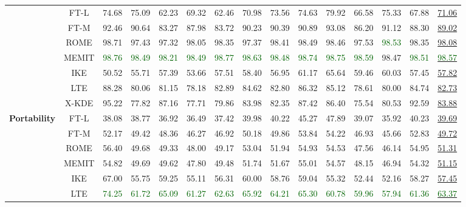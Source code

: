 \begin{table*}[!h]
{\begin{tabular}{ccccccccccccccc}
            & FT-L & 74.68 & 75.09 & 62.23 & 69.32 & 62.46 & 70.98 & 73.56 & 74.63 & 79.92 & 66.58 & 75.33 & 67.88 & \underline{71.06} \\
            & FT-M &  92.46 & 90.64 & 83.27 & 87.98 & 83.72 & 90.23 & 90.39 & 90.89 & 93.08 & 86.20 & 91.12 & 88.30 & \underline{89.02} \\
            & ROME & 98.71 & 97.43 & 97.32 & 98.05 & 98.35 & 97.37 & 98.41 & 98.49 & 98.46 & 97.53 & \textcolor{darkgreen}{98.53} & 98.35 & \underline{98.08} \\
            & MEMIT & \textcolor{darkgreen}{98.76} &\textcolor{darkgreen}{ 98.49} & \textcolor{darkgreen}{98.21 }&\textcolor{darkgreen}{ 98.49 }& \textcolor{darkgreen}{98.77 }& \textcolor{darkgreen}{98.63 }& \textcolor{darkgreen}{98.48} &\textcolor{darkgreen}{ 98.74 }&\textcolor{darkgreen}{ 98.75} & \textcolor{darkgreen}{98.59} & 98.47 & \textcolor{darkgreen}{98.51} &\underline{\textcolor{darkgreen}{ 98.57}} \\
            & IKE & 50.52 & 55.71 & 57.39 & 53.66 & 57.51 & 58.40 & 56.95 & 61.17 & 65.64 & 59.46 & 60.03 & 57.45 & \underline{57.82} \\
            & LTE & 88.28 & 80.06 & 81.15 & 78.18 & 82.89 & 84.62 & 82.80 & 86.32 & 85.12 & 78.61 & 80.00 & 84.74 & \underline{82.73} \\
           \cmidrule{2-15}
           & X-KDE & 95.22 & 77.82 & 87.16 & 77.71 & 79.86 & 83.98 & 82.35 & 87.42 & 86.40 & 75.54 & 80.53 & 92.59 & \underline{83.88} \\
           \midrule
           \multirow{7}{*}{\textbf{Portability}} 
           & FT-L & 38.08 & 38.77 & 36.92 & 36.49 & 37.42 & 39.98 & 40.22 & 45.27 & 47.89 & 39.07 & 35.92 & 40.23 & \underline{39.69 }\\
           & FT-M &  52.17 & 49.42 & 48.36 & 46.27 & 46.92 & 50.18 & 49.86 & 53.84 & 54.22 & 46.93 & 45.66 & 52.83 & \underline{49.72} \\   
           & ROME & 56.40 & 49.68 & 49.33 & 48.00 & 49.17 & 53.04 & 51.94 & 54.93 & 54.53 & 47.56 & 46.14 & 54.95 & \underline{51.31} \\
           & MEMIT & 54.82 & 49.69 & 49.62 & 47.80 & 49.48 & 51.74 & 51.67 & 55.01 & 54.57 & 48.15 & 46.94 & 54.32 & \underline{51.15} \\
           & IKE & 67.00 & 55.75 & 59.25 & 55.11 & 56.31 & 60.00 & 58.76 & 59.04 & 55.32 & 52.44 & 52.16 & 58.27 & \underline{57.45} \\
           & LTE  &\textcolor{darkgreen}{ 74.25 }& \textcolor{darkgreen}{61.72 }& \textcolor{darkgreen}{65.09 }& \textcolor{darkgreen}{61.27} & \textcolor{darkgreen}{62.63 }&\textcolor{darkgreen}{ 65.92} & \textcolor{darkgreen}{64.21} & \textcolor{darkgreen}{65.30 }& \textcolor{darkgreen}{60.78} &\textcolor{darkgreen}{ 59.96 }& \textcolor{darkgreen}{57.94} & \textcolor{darkgreen}{61.36} &\underline{\textcolor{darkgreen}{ 63.37}} \\


\end{tabular}}
\end{table*}
